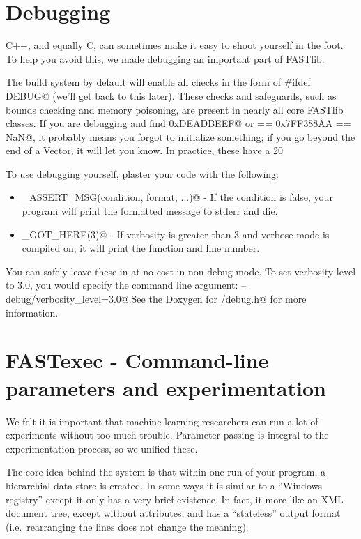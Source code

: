 \documentclass[letter]{report}
\begin{document}
\section{Debugging}

C++, and equally C, can sometimes make it easy to shoot yourself in the foot. To help you avoid this, we made debugging an important part of FASTlib.

The build system by default will enable all checks in the form of \verb@#ifdef DEBUG@ (we'll get back to this later). These checks and safeguards, such as bounds checking and memory poisoning, are present in nearly all core FASTlib classes. If you are debugging and find \verb@0xDEADBEEF@ or  == 0x7FF388AA == NaN@, it probably means you forgot to initialize something; if you go beyond the end of a Vector, it will let you know. In practice, these have a 20%

To use debugging yourself, plaster your code with the following:
\begin{itemize}
\item \verb@DEBUG_ASSERT_MSG(condition, format, ...)@ - If the condition is false, your program will print the formatted message to stderr and die.
\item \verb@VERBOSE_GOT_HERE(3)@ - If verbosity is greater than 3 and verbose-mode is compiled on, it will print the function and line number. 
\end{itemize}
You can safely leave these in at no cost in non debug mode. To set verbosity level to 3.0, you would specify the command line argument: \verb@--debug/verbosity_level=3.0@.See the Doxygen for \verb@base/debug.h@ for more information.

\section{FASTexec - Command-line parameters and experimentation}

We felt it is important that machine learning researchers can run a lot of experiments without too much trouble. Parameter passing is integral to the experimentation process, so we unified these.

The core idea behind the system is that within one run of your program, a hierarchial data store is created. In some ways it is similar to a ``Windows registry'' except it only has a very brief existence. In fact, it more like an XML document tree, except without attributes, and has a ``stateless'' output format (i.e.~rearranging the lines does not change the meaning).
\end{document}
